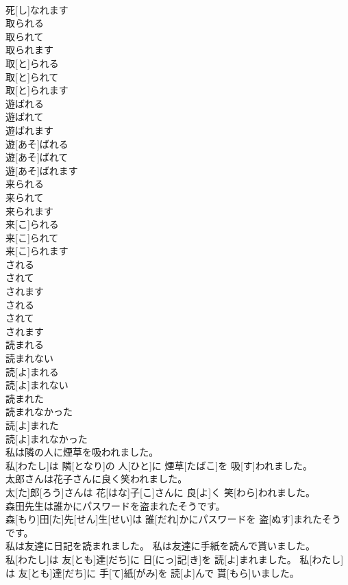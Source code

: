 \documentclass[8pt]{extreport}
\begin{document}
\begin{CJK}{UTF8}{min}
\\	死[し]なれます
\\	取られる 
\\	取られて 
\\	取られます	
\\	取[と]られる 
\\	取[と]られて 
\\	取[と]られます
\\	遊ばれる 
\\	遊ばれて 
\\	遊ばれます	
\\	遊[あそ]ばれる 
\\	遊[あそ]ばれて 
\\	遊[あそ]ばれます
\\	来られる 
\\	来られて 
\\	来られます	
\\	来[こ]られる 
\\	来[こ]られて 
\\	来[こ]られます
\\	される 
\\	されて 
\\	されます	
\\	される 
\\	されて 
\\	されます
\\	読まれる 
\\	読まれない	
\\	読[よ]まれる 
\\	読[よ]まれない
\\	読まれた 
\\	読まれなかった	
\\	読[よ]まれた 
\\	読[よ]まれなかった
\\	私は隣の人に煙草を吸われました。	
\\	私[わたし]は 隣[となり]の 人[ひと]に 煙草[たばこ]を 吸[す]われました。
\\	太郎さんは花子さんに良く笑われました。	
\\	太[た]郎[ろう]さんは 花[はな]子[こ]さんに 良[よ]く 笑[わら]われました。
\\	森田先生は誰かにパスワードを盗まれたそうです。	
\\	森[もり]田[た]先[せん]生[せい]は 誰[だれ]かにパスワードを 盗[ぬす]まれたそうです。
\\	私は友達に日記を読まれました。 私は友達に手紙を読んで貰いました。	
\\	私[わたし]は 友[とも]達[だち]に 日[にっ]記[き]を 読[よ]まれました。 私[わたし]は 友[とも]達[だち]に 手[て]紙[がみ]を 読[よ]んで 貰[もら]いました。

\end{CJK}
\end{document}
